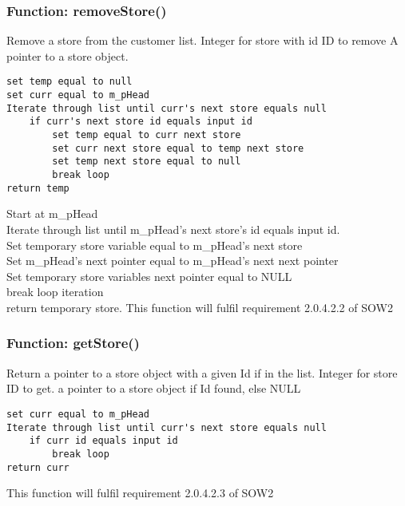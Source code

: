 \documentclass[12pt]{article}%
\newcounter{subsubsubsection}[subsubsection]
\begin{document}
\subsubsection{Function: removeStore()}
Remove a store from the customer list.
Integer for store with id ID to remove
A pointer to a store object.
\begin{verbatim}
set temp equal to null
set curr equal to m_pHead
Iterate through list until curr's next store equals null
    if curr's next store id equals input id
        set temp equal to curr next store
        set curr next store equal to temp next store
        set temp next store equal to null
        break loop
return temp
\end{verbatim}
Start at m\_pHead \\
Iterate through list until m\_pHead's next store's id equals input id. \\
Set temporary store variable equal to m\_pHead's next store \\
Set m\_pHead's next pointer equal to m\_pHead's next next pointer\\
Set temporary store variables next pointer equal to NULL\\
break loop iteration \\
return temporary store.
This function will fulfil requirement 2.0.4.2.2 of SOW2

\subsubsection{Function: getStore()}
Return a pointer to a store object with a given Id if in the list.
Integer for store ID to get.
a pointer to a store object if Id found, else NULL
\begin{verbatim}
set curr equal to m_pHead
Iterate through list until curr's next store equals null
    if curr id equals input id
        break loop
return curr
\end{verbatim}
This function will fulfil requirement 2.0.4.2.3 of SOW2
\end{document}
